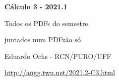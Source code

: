 \documentclass[oneside,12pt]{article}
\begin{document}
%



\def\u#1{\par{\footnotesize \url{#1}}}

\def\drafturl{http://angg.twu.net/LATEX/2021-1-C3.pdf}
\def\drafturl{http://angg.twu.net/2021.1-C3.html}
\def\draftfooter{\tiny \href{\drafturl}{\jobname{}} \ColorBrown{\shorttoday{} \hours}}



%

\thispagestyle{empty}

\begin{center}

\vspace*{1.2cm}

{\bf \Large Cálculo 3 - 2021.1}

\bsk

Todos os PDFs do semestre

juntados num PDFzão só

\bsk

Eduardo Ochs - RCN/PURO/UFF

\url{http://angg.twu.net/2021.2-C3.html}

\end{center}

\newpage

\def\incl#1{}


\incl{2021-1-C3-intro}
\end{document}
